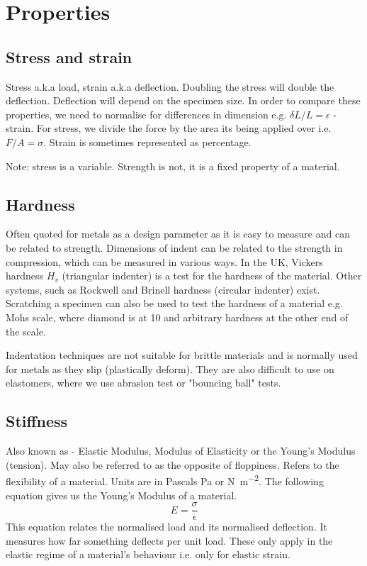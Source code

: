 \documentclass[class=report, crop=false, 12pt,a4paper]{standalone}
\begin{document}
\section{Properties}
\subsection{Stress and strain}
Stress a.k.a load, strain a.k.a deflection. Doubling the stress will double the deflection. Deflection will depend on the specimen size. In order to compare these properties, we need to normalise for differences in dimension e.g. \(\delta L / L = \epsilon\) - strain. For stress, we divide the force by the area its being applied over i.e. \(F/A = \sigma \). Strain is sometimes represented as percentage. 

Note: stress is a variable. Strength is not, it is a fixed property of a material.
\subsection{Hardness}
Often quoted for metals as a design parameter as it is easy to measure and can be related to strength. Dimensions of indent can be related to the strength in compression, which can be measured in various ways. In the UK, Vickers hardness \(H_v\) (triangular indenter) is a test for the hardness of the material. Other systems, such as Rockwell and Brinell hardness (circular indenter) exist. Scratching a specimen can also be used to test the hardness of a material e.g. Mohs scale, where diamond is at 10 and arbitrary hardness at the other end of the scale. 

Indentation techniques are not suitable for brittle materials and is normally used for metals as they slip (plastically deform). They are also difficult to use on elastomers, where we use abrasion test or "bouncing ball" tests. 
\subsection{Stiffness}
Also known as - Elastic Modulus, Modulus of Elasticity or the Young's Modulus (tension). May also be referred to as the opposite of floppiness. Refers to the flexibility of a material. Units are in Pascals \si{\pascal} or \si{\newton\per\meter\squared}. The following equation gives us the Young's Modulus of a material.
\begin{equation}
  E = \frac{\sigma}{\epsilon}
\end{equation}
This equation relates the normalised load and its normalised deflection. It measures how far something deflects per unit load. These only apply in the elastic regime of a material's behaviour i.e. only for elastic strain. 
\end{document}

